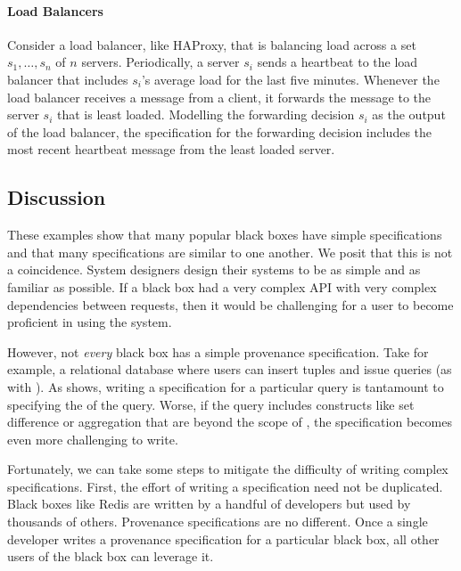 \paragraph{Load Balancers}
Consider a load balancer, like HAProxy, that is balancing load across a set
$s_1, \ldots, s_n$ of $n$ servers. Periodically, a server $s_i$ sends a
heartbeat to the load balancer that includes $s_i$'s average load for the last
five minutes. Whenever the load balancer receives a message from a client, it
forwards the message to the server $s_i$ that is least loaded. Modelling the
forwarding decision $s_i$ as the output of the load balancer, the
\watprovenance{} specification for the forwarding decision includes the most
recent heartbeat message from the least loaded server.


\subsection{Discussion}
These examples show that many popular black boxes have simple \watprovenance{}
specifications and that many \watprovenance{} specifications are similar to one
another. We posit that this is not a coincidence. System designers
design their systems to be as simple and as familiar as possible. If a black
box had a very complex API with very complex dependencies between requests,
then it would be challenging for a user to become proficient in using the
system.

However, not \emph{every} black box has a simple provenance specification. Take
for example, a relational database where users can insert tuples and issue
queries (as with ). As 
shows, writing a \watprovenance{} specification for a particular query is
tantamount to specifying the \whyprovenance{} of the query. Worse, if the
query includes constructs like set difference or aggregation that are beyond
the scope of \whyprovenance{}, the \watprovenance{} specification becomes even
more challenging to write.

Fortunately, we can take some steps to mitigate the difficulty of writing
complex \watprovenance{} specifications.  First, the effort of writing a
\watprovenance{} specification need not be duplicated. Black boxes like Redis
are written by a handful of developers but used by thousands of others.
Provenance specifications are no different. Once a single developer writes a
provenance specification for a particular black box, all other users of the
black box can leverage it.

